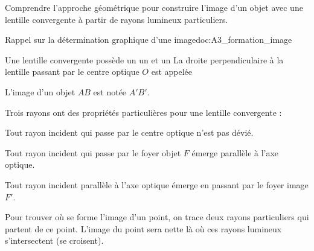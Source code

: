 \teteSndLumi

\vspace*{-30pt}


\begin{objectifs}
  \item Comprendre l'approche géométrique pour construire l'image d'un objet avec une lentille convergente à partir de rayons lumineux particuliers.
\end{objectifs}


\begin{doc}{Rappel sur la détermination graphique d'une image}{doc:A3_formation_image}
  \begin{importants}
    Une lentille convergente possède un  un et un 
    La droite perpendiculaire à la lentille passant par le centre optique $O$ est appelée 
  \end{importants}
  L'image d'un objet $AB$ est notée $A'B'$.
  
  \begin{center}
  \end{center}
  
  \begin{importants}
    Trois rayons ont des propriétés particulières pour une lentille convergente :
  \begin{listePoints}
    \item Tout rayon incident qui passe par le centre optique n'est pas dévié.
    \item Tout rayon incident qui passe par le foyer objet $F$ émerge parallèle à l'axe optique.
    \item Tout rayon incident parallèle à l'axe optique émerge en passant par le foyer image $F'$.
  \end{listePoints}
  \end{importants}
  Pour trouver où se forme l'image d'un point, on trace deux rayons particuliers qui partent de ce point. 
  L'image du point sera nette là où ces rayons lumineux s'intersectent (se croisent).
\end{doc}


